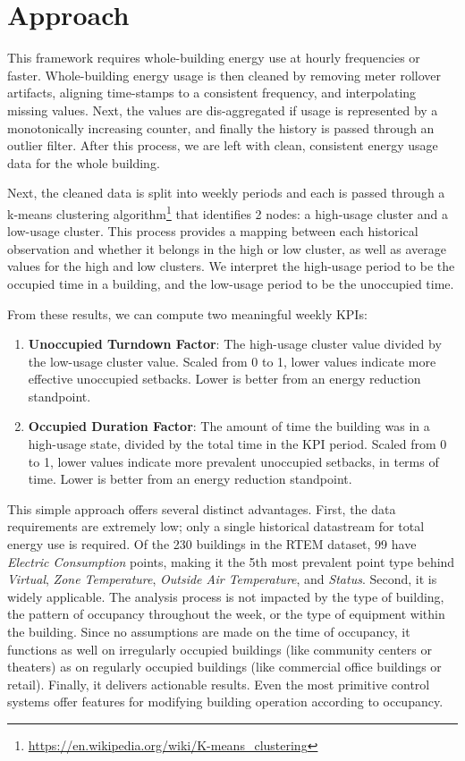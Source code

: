\documentclass[a4paper]{article}
\begin{document}
\section{Approach}

This framework requires whole-building energy use at hourly frequencies or faster. Whole-building energy usage is then cleaned by removing meter rollover artifacts, aligning time-stamps to a consistent frequency, and interpolating missing values. Next, the values are dis-aggregated if usage is represented by a monotonically increasing counter, and finally the history is passed through an outlier filter. After this process, we are left with clean, consistent energy usage data for the whole building.

Next, the cleaned data is split into weekly periods and each is passed through a k-means clustering algorithm\footnote{\url{https://en.wikipedia.org/wiki/K-means\_clustering}} that identifies 2 nodes: a high-usage cluster and a low-usage cluster. This process provides a mapping between each historical observation and whether it belongs in the high or low cluster, as well as average values for the high and low clusters. We interpret the high-usage period to be the occupied time in a building, and the low-usage period to be the unoccupied time.

From these results, we can compute two meaningful weekly KPIs:
\begin{enumerate}
\item{\textbf{Unoccupied Turndown Factor}: The high-usage cluster value divided by the low-usage cluster value. Scaled from 0 to 1, lower values indicate more effective unoccupied setbacks. Lower is better from an energy reduction standpoint.}
\item{\textbf{Occupied Duration Factor}: The amount of time the building was in a high-usage state, divided by the total time in the KPI period. Scaled from 0 to 1, lower values indicate more prevalent unoccupied setbacks, in terms of time.  Lower is better from an energy reduction standpoint.}
\end{enumerate}

This simple approach offers several distinct advantages. First, the data requirements are extremely low; only a single historical datastream for total energy use is required. Of the 230 buildings in the RTEM dataset, 99 have \textit{Electric Consumption} points, making it the 5th most prevalent point type behind \textit{Virtual}, \textit{Zone Temperature}, \textit{Outside Air Temperature}, and \textit{Status}. Second, it is widely applicable. The analysis process is not impacted by the type of building, the pattern of occupancy throughout the week, or the type of equipment within the building. Since no assumptions are made on the time of occupancy, it functions as well on irregularly occupied buildings (like community centers or theaters) as on regularly occupied buildings (like commercial office buildings or retail). Finally, it delivers actionable results. Even the most primitive control systems offer features for modifying building operation according to occupancy.
\end{document}
